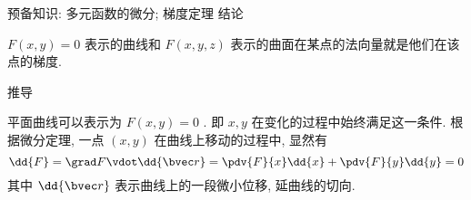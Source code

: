 
预备知识: 多元函数的微分; 梯度定理
结论

$F(x, y) = 0$ 表示的曲线和 $F(x, y, z)$ 表示的曲面在某点的法向量就是他们在该点的梯度.

推导

平面曲线可以表示为 $F(x, y) = 0$ . 即 $x, y$ 在变化的过程中始终满足这一条件. 根据微分定理, 一点 $(x, y)$ 在曲线上移动的过程中, 显然有
\begin{equation}
\dd{F} = \grad F \vdot \dd{\bvec r} = \pdv{F}{x} \dd{x} + \pdv{F}{y} \dd{y} = 0
\end{equation}
其中 $\dd{\bvec r}$ 表示曲线上的一段微小位移, 延曲线的切向.